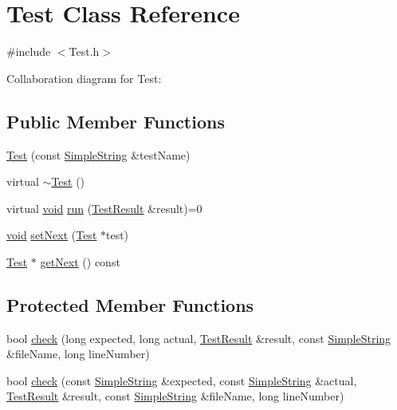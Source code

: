 \hypertarget{classTest}{}\section{Test Class Reference}
\label{classTest}


{\ttfamily \#include $<$Test.\+h$>$}



Collaboration diagram for Test\+:
\subsection*{Public Member Functions}
\begin{DoxyCompactItemize}
\item 
\hyperlink{classTest_ad8ba311564adee8c7e172a0f7bd05e9f}{Test} (const \hyperlink{classSimpleString}{Simple\+String} \&test\+Name)
\item 
virtual \hyperlink{classTest_ac9dcc51f46141d9ed1e8206ca0011b8c}{$\sim$\+Test} ()
\item 
virtual \hyperlink{png_8h_aa8c59027f9ab2769342f248709d68d17}{void} \hyperlink{classTest_aea30a1dd3a3020152db8a8bbb8e4e3f5}{run} (\hyperlink{classTestResult}{Test\+Result} \&result)=0
\item 
\hyperlink{png_8h_aa8c59027f9ab2769342f248709d68d17}{void} \hyperlink{classTest_aa0b9d21384c4f6befebfe26a0753a103}{set\+Next} (\hyperlink{classTest}{Test} $\ast$test)
\item 
\hyperlink{classTest}{Test} $\ast$ \hyperlink{classTest_a62a8bda79bdd9d5cf799b55f402ebc0f}{get\+Next} () const 
\end{DoxyCompactItemize}
\subsection*{Protected Member Functions}
\begin{DoxyCompactItemize}
\item 
bool \hyperlink{classTest_a94cc0bdc66d2ded682043fdaf74ffed3}{check} (long expected, long actual, \hyperlink{classTestResult}{Test\+Result} \&result, const \hyperlink{classSimpleString}{Simple\+String} \&file\+Name, long line\+Number)
\item 
bool \hyperlink{classTest_a9a24e42445403d8e61ad11998c380f34}{check} (const \hyperlink{classSimpleString}{Simple\+String} \&expected, const \hyperlink{classSimpleString}{Simple\+String} \&actual, \hyperlink{classTestResult}{Test\+Result} \&result, const \hyperlink{classSimpleString}{Simple\+String} \&file\+Name, long line\+Number)
\end{DoxyCompactItemize}
